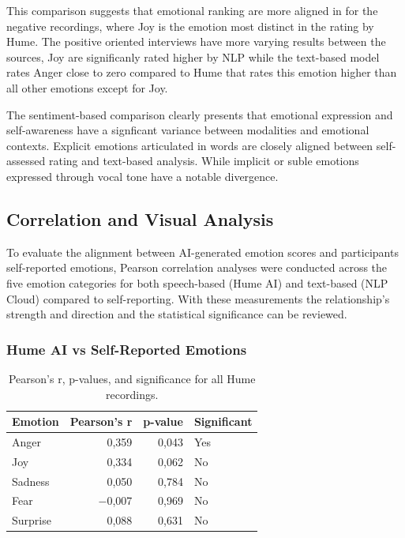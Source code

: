This comparison suggests that emotional ranking are more aligned in for the negative recordings, where Joy is the emotion most distinct in the rating by Hume. 
The positive oriented interviews have more varying results between the sources, Joy are significanly rated higher by NLP while the text-based model rates Anger close to zero compared to Hume that rates this emotion higher than all other emotions except for Joy. 

The sentiment-based comparison clearly presents that emotional expression and self-awareness have a signficant variance between modalities and emotional contexts. 
Explicit emotions articulated in words are closely aligned between self-assessed rating and text-based analysis. 
While implicit or suble emotions expressed through vocal tone have a notable divergence. 

\subsection{Correlation and Visual Analysis}
To evaluate the alignment between AI-generated emotion scores and participants self-reported emotions, 
Pearson correlation analyses were conducted across the five emotion categories for both speech-based (Hume AI) and text-based (NLP Cloud) compared to self-reporting.
With these measurements the relationship's strength and direction and the statistical significance can be reviewed. 

\subsubsection{Hume AI vs Self-Reported Emotions}
\begin{table}[H]
    \centering
    \caption*{\textbf{All Hume}}
    \begin{tabular}{lrrl}
      \toprule
      \textbf{Emotion} & \textbf{Pearson’s r} & \textbf{p-value} & \textbf{Significant} \\
      \midrule
      Anger    & 0,359 & 0,043 & Yes \\
      Joy      & 0,334 & 0,062 & No  \\
      Sadness  & 0,050 & 0,784 & No  \\
      Fear     & \(-\)0,007 & 0,969 & No  \\
      Surprise & 0,088 & 0,631 & No  \\
      \bottomrule
    \end{tabular}
    \caption{Pearson’s r, p-values, and significance for all Hume recordings.}
    \label{tab:rq3_corr-hume-all}
  \end{table}

